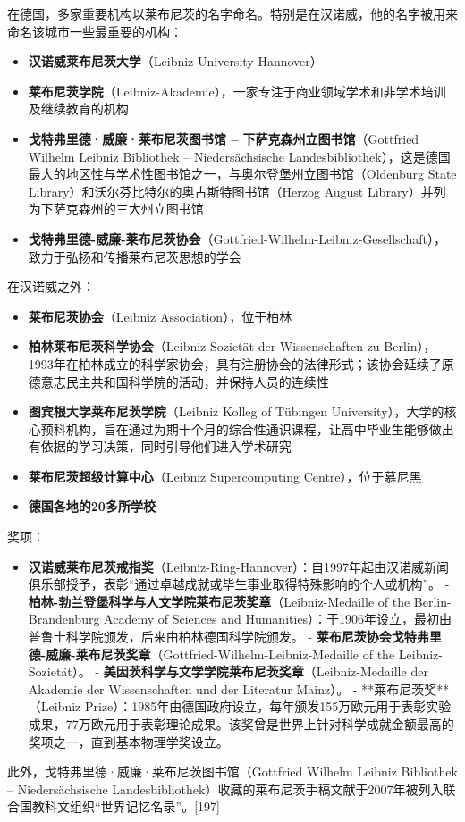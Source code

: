 在德国，多家重要机构以莱布尼茨的名字命名。特别是在汉诺威，他的名字被用来命名该城市一些最重要的机构：
\begin{itemize}
\item \textbf{汉诺威莱布尼茨大学}（Leibniz University Hannover）  
\item \textbf{莱布尼茨学院}（Leibniz-Akademie），一家专注于商业领域学术和非学术培训及继续教育的机构  
\item \textbf{戈特弗里德·威廉·莱布尼茨图书馆 – 下萨克森州立图书馆}（Gottfried Wilhelm Leibniz Bibliothek – Niedersächsische Landesbibliothek），这是德国最大的地区性与学术性图书馆之一，与奥尔登堡州立图书馆（Oldenburg State Library）和沃尔芬比特尔的奥古斯特图书馆（Herzog August Library）并列为下萨克森州的三大州立图书馆  
\item \textbf{戈特弗里德-威廉-莱布尼茨协会}（Gottfried-Wilhelm-Leibniz-Gesellschaft），致力于弘扬和传播莱布尼茨思想的学会  
\end{itemize}
在汉诺威之外：
\begin{itemize}
\item \textbf{莱布尼茨协会}（Leibniz Association），位于柏林  
\item \textbf{柏林莱布尼茨科学协会}（Leibniz-Sozietät der Wissenschaften zu Berlin），1993年在柏林成立的科学家协会，具有注册协会的法律形式；该协会延续了原德意志民主共和国科学院的活动，并保持人员的连续性  
\item \textbf{图宾根大学莱布尼茨学院}（Leibniz Kolleg of Tübingen University），大学的核心预科机构，旨在通过为期十个月的综合性通识课程，让高中毕业生能够做出有依据的学习决策，同时引导他们进入学术研究  
\item \textbf{莱布尼茨超级计算中心}（Leibniz Supercomputing Centre），位于慕尼黑  
\item \textbf{德国各地的20多所学校 } 
\end{itemize}
奖项：

\begin{itemize}
\item \textbf{汉诺威莱布尼茨戒指奖}（Leibniz-Ring-Hannover）：自1997年起由汉诺威新闻俱乐部授予，表彰“通过卓越成就或毕生事业取得特殊影响的个人或机构”。  
- \textbf{柏林-勃兰登堡科学与人文学院莱布尼茨奖章}（Leibniz-Medaille of the Berlin-Brandenburg Academy of Sciences and Humanities）：于1906年设立，最初由普鲁士科学院颁发，后来由柏林德国科学院颁发。  
- \textbf{莱布尼茨协会戈特弗里德-威廉-莱布尼茨奖章}（Gottfried-Wilhelm-Leibniz-Medaille of the Leibniz-Sozietät）。  
- \textbf{美因茨科学与文学学院莱布尼茨奖章}（Leibniz-Medaille der Akademie der Wissenschaften und der Literatur Mainz）。  
- **莱布尼茨奖**（Leibniz Prize）：1985年由德国政府设立，每年颁发155万欧元用于表彰实验成果，77万欧元用于表彰理论成果。该奖曾是世界上针对科学成就金额最高的奖项之一，直到基本物理学奖设立。
\end{itemize}

此外，戈特弗里德·威廉·莱布尼茨图书馆（Gottfried Wilhelm Leibniz Bibliothek – Niedersächsische Landesbibliothek）收藏的莱布尼茨手稿文献于2007年被列入联合国教科文组织“世界记忆名录”。[197]